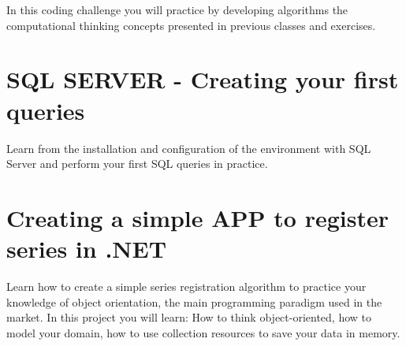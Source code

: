 \documentclass[12pt,executivepaper]{article}
\begin{document}
	In this coding challenge you will practice by developing algorithms the computational thinking concepts presented in previous classes and exercises.
	
	\section{SQL SERVER - Creating your first queries}
	
	Learn from the installation and configuration of the environment with SQL Server and perform your first SQL queries in practice.
	
	\section{Creating a simple APP to register series in .NET}
	
	Learn how to create a simple series registration algorithm to practice your knowledge of object orientation, the main programming paradigm used in the market. In this project you will learn: How to think object-oriented, how to model your domain, how to use collection resources to save your data in memory.
	
\end{document}
